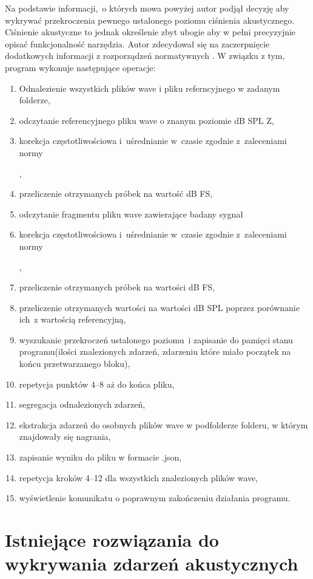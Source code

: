 \documentclass[eng,printmode]{mgr}
\begin{document}
Na podstawie informacji,~o których mowa powyżej autor podjął decyzję aby wykrywać przekroczenia pewnego ustalonego poziomu ciśnienia akustycznego. Ciśnienie akustyczne to jednak określenie zbyt ubogie aby w pełni precyzyjnie opisać funkcjonalność narzędzia. Autor zdecydował się na zaczerpnięcie dodatkowych informacji z rozporządzeń normatywnych \cite{PN-EN_61672-1:2014-03}. W związku z tym, program wykonuje następujące operacje:
\begin{enumerate}
\item Odnalezienie wszystkich plików wave i pliku referncyjnego w zadanym folderze,
\item odczytanie referencyjnego pliku wave o znanym poziomie dB SPL Z,
\item korekcja częstotliwościowa i~uśrednianie w~czasie zgodnie z~zaleceniami normy
  
\cite{PN-EN_61672-1:2014-03},
\item przeliczenie otrzymanych próbek na wartość dB FS,
\item odczytanie fragmentu pliku wave zawierające badany sygnał
\item korekcja częstotliwościowa i~uśrednianie w~czasie zgodnie z~zaleceniami normy 

\cite{PN-EN_61672-1:2014-03},
\item przeliczenie otrzymanych próbek na wartości dB FS,
\item przeliczenie otrzymanych wartości na wartości dB SPL poprzez porównanie ich~z wartością referencyjną,
\item wyszukanie przekroczeń ustalonego poziomu~i zapisanie do pamięci stanu programu(ilości znalezionych zdarzeń, zdarzeniu które miało początek na końcu przetwarzanego bloku),
\item repetycja punktów 4--8 aż do końca pliku,
\item segregacja odnalezionych zdarzeń,
\item ekstrakcja zdarzeń do osobnych plików wave w podfolderze folderu, w którym znajdowały się nagrania,
\item zapisanie wyniku do pliku w formacie .json,
\item repetycja kroków 4--12 dla wszystkich znalezionych plików wave,
\item wyświetlenie komunikatu o poprawnym zakończeniu działania programu.
\end{enumerate}
\section{Istniejące rozwiązania do wykrywania zdarzeń akustycznych}
\end{document}
